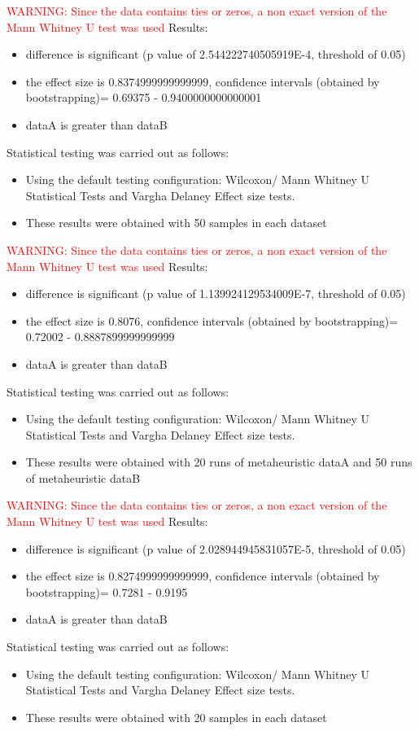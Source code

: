 \documentclass[]{article}
\begin{document}
\textcolor{Red}{WARNING: Since the data contains ties or zeros, a non exact version of the Mann Whitney U test was used}
Results:
\begin{itemize}
\item{difference is significant (p value of 2.544222740505919E-4, threshold of 0.05)}
\item{the effect size is 0.8374999999999999, confidence intervals (obtained by bootstrapping)= 0.69375 - 0.9400000000000001}
\item{dataA is greater than dataB}
\end{itemize}Statistical testing was carried out as follows: \begin{itemize}
\item{Using the default testing configuration: Wilcoxon/ Mann Whitney U Statistical Tests and Vargha Delaney Effect size tests.}
\item{These results were obtained with 50 samples in each dataset}
\end{itemize}
\textcolor{Red}{WARNING: Since the data contains ties or zeros, a non exact version of the Mann Whitney U test was used}
Results:
\begin{itemize}
\item{difference is significant (p value of 1.139924129534009E-7, threshold of 0.05)}
\item{the effect size is 0.8076, confidence intervals (obtained by bootstrapping)= 0.72002 - 0.8887899999999999}
\item{dataA is greater than dataB}
\end{itemize}Statistical testing was carried out as follows: \begin{itemize}
\item{Using the default testing configuration: Wilcoxon/ Mann Whitney U Statistical Tests and Vargha Delaney Effect size tests.}
\item{These results were obtained with 20 runs of metaheuristic dataA and 50 runs of metaheuristic dataB}
\end{itemize}
\textcolor{Red}{WARNING: Since the data contains ties or zeros, a non exact version of the Mann Whitney U test was used}
Results:
\begin{itemize}
\item{difference is significant (p value of 2.028944945831057E-5, threshold of 0.05)}
\item{the effect size is 0.8274999999999999, confidence intervals (obtained by bootstrapping)= 0.7281 - 0.9195}
\item{dataA is greater than dataB}
\end{itemize}Statistical testing was carried out as follows: \begin{itemize}
\item{Using the default testing configuration: Wilcoxon/ Mann Whitney U Statistical Tests and Vargha Delaney Effect size tests.}
\item{These results were obtained with 20 samples in each dataset}
\end{itemize}
\end{document}

